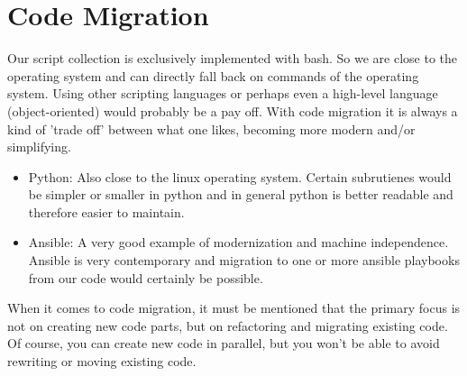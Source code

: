 \section{Code Migration}
Our script collection is exclusively implemented with bash. So we are close to the operating system and can directly fall back on commands of the operating system.
Using other scripting languages or perhaps even a high-level language (object-oriented) would probably be a pay off.
With code migration it is always a kind of 'trade off' between what one likes, becoming more modern and/or simplifying.
\begin{itemize}
	\item \gls{Python}:
	\subitem Also close to the linux operating system. Certain subrutienes would be simpler or smaller in python and in general python is better readable and therefore easier to maintain. 
	\item \gls{Ansible}:
	\subitem A very good example of modernization and machine independence. Ansible is very contemporary and migration to one or more ansible playbooks from our code would certainly be possible.
\end{itemize}
When it comes to code migration, it must be mentioned that the primary focus is not on creating new code parts, but on refactoring and migrating existing code. Of course, you can create new code in parallel, but you won't be able to avoid rewriting or moving existing code.